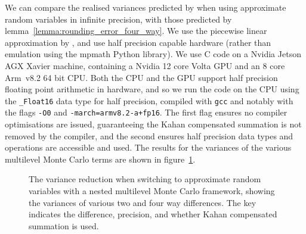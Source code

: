 \documentclass[9pt,a4paper,english]{extarticle}
\begin{document}
We can compare the realised variances  predicted by  \citet{giles2020approximate,giles2020approximating} when using approximate random variables in infinite precision, with those predicted by lemma~\ref{lemma:rounding_error_four_way}. We use the piecewise linear approximation by \citet{giles2020approximating}, and use half precision capable hardware (rather than emulation using the mpmath Python library). We use C code on a Nvidia Jetson AGX Xavier machine, containing a Nvidia 12 core Volta GPU and an 8 core Arm~v8.2 64 bit CPU. Both the CPU and the GPU support half precision floating point arithmetic in hardware, and so we run the code on the CPU using the \texttt{\_Float16} data type for half precision,  compiled with \texttt{gcc} and notably with the flags \texttt{-O0} and \texttt{-march=armv8.2-a+fp16}. The first flag ensures no compiler optimisations are issued, guaranteeing the Kahan compensated summation is not removed by the compiler, and the second ensures half precision data types and operations are accessible and used. The results for the variances of the various multilevel Monte Carlo terms are shown in figure~\ref{fig:four_way_variance}.

\begin{figure}[htb]
\centering

\hfil
{}\hfil
{}\hfil

\caption{The variance reduction when switching to approximate random variables with a nested multilevel Monte Carlo framework, showing the variances of various two and four way differences. The key indicates the difference, precision, and whether Kahan compensated summation is used.}
\label{fig:four_way_variance}
\end{figure}
\end{document}

